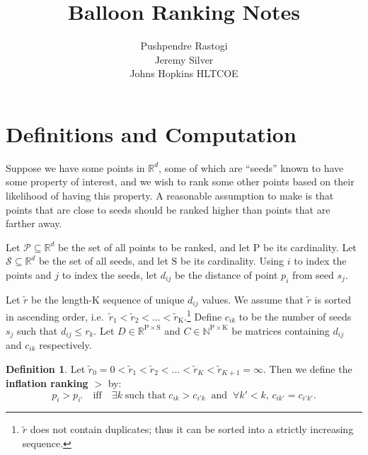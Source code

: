 \documentclass[11pt, oneside, fleqn, UTF8]{article} 	%
\title{\Huge Balloon Ranking Notes}
\author{Pushpendre Rastogi \\ Jeremy Silver \\ Johns Hopkins HLTCOE}
\theoremstyle{definition}
\newtheorem{defn}{Definition}
\newcommand{\tr}[0]{\tilde{r}}
\newcommand{\rmP}[0]{\mathrm{P}}
\newcommand{\rmK}[0]{\mathrm{K}}
\newcommand{\rmS}[0]{\mathrm{S}}
\newcommand{\Rd}{\mathbb{R}^d}
\begin{document}
\maketitle

\section{Definitions and Computation}
Suppose we have some points in $\mathbb{R}^d$, some of which are ``seeds'' known to have some property of interest, and we wish to rank some other points based on their likelihood of having this property.  A reasonable assumption to make is that points that are close to seeds should be ranked higher than points that are farther away.  

Let $\mathcal{P} \subseteq \Rd$ be the set of all points to be ranked, and let $\rmP$ be its cardinality.
Let $\mathcal{S} \subseteq \Rd$ be the set of all seeds, and let $\rmS$ be its cardinality.
Using $i$ to index the points and $j$ to index the seeds, let $d_{ij}$ be the distance of point $p_i$ from
seed $s_j$.

Let $\tr$ be the length-$\rmK$ sequence of unique $d_{ij}$ values.
We assume that $\tr$
is sorted in ascending order, i.e.\ $\tr_1 < \tr_2 < \ldots < \tr_{\rmK}$.\footnote{$\tr$ does not contain duplicates; thus it can be sorted into a strictly increasing sequence.}
Define $c_{ik}$ to be the number of seeds $s_j$ such that $d_{ij} \le r_k$.
Let $D \in \mathbb{R}^{\rmP \times \rmS}$ and
$C \in \mathbb{N}^{\rmP \times \rmK}$ be matrices containing
$d_{ij}$ and $c_{ik}$ respectively.
\newline
\begin{defn}
Let $\tr_0 = 0 < \tr_1 < \tr_2 < \ldots < \tr_K < \tr_{K+1} = \infty$.  Then we define the \textbf{inflation ranking} $>$  by:
$$ p_i > p_{i'} \quad \text{iff} \quad \exists k \; \text{such that} \; c_{ik} > c_{i'k} \; \; \text{and} \; \; \forall k' < k, \, c_{ik'} = c_{i'k'}. $$
\end{defn}
\end{document}

